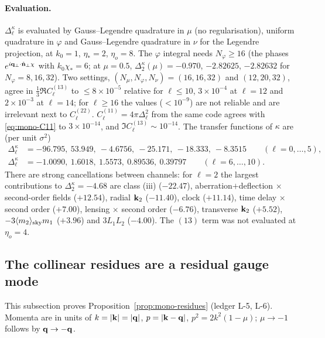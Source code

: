 \paragraph{Evaluation.}  $\Delta^\kappa_\ell$ is evaluated by Gauss--Legendre quadrature in $\mu$ (no regularisation), uniform quadrature in
$\varphi$ and Gauss--Legendre quadrature in $\nu$ for the Legendre projection, at $k_0=1$, $\eta_*=2$, $\eta_o=8$.  The $\varphi$ integral needs
$N_\varphi\ge16$ (the phases $e^{i\mathbf q_\perp\cdot\hat{\mathbf n}_\perp\chi}$ with $k_0\chi_*=6$; at $\mu=0.5$, $\Delta^\kappa_2(\mu)=-0.970$, $-2.82625$, $-2.82632$ for
$N_\varphi=8,16,32$).  Two settings, $(N_\mu,N_\varphi,N_\nu)=(16,16,32)$ and $(12,20,32)$, agree in $\tfrac13\Re C^{(13)}_\ell$ to $\le8\times10^{-5}$ relative
for $\ell\le10$, $3\times10^{-4}$ at $\ell=12$ and $2\times10^{-3}$ at $\ell=14$; for $\ell\ge16$ the values ($<10^{-9}$) are not reliable and are
irrelevant next to $C^{(22)}_\ell$.  $C^{(11)}_\ell=4\pi\Delta_\ell^2$ from the same code agrees with \eqref{eq:mono-C11} to $3\times10^{-14}$, and
$\Im C^{(13)}_\ell\sim10^{-14}$.  The transfer functions of $\kappa$ are (per unit $\sigma^2$)
\begin{align}
\Delta^\kappa_\ell&=-96.795,\ 53.949,\ -4.6756,\ -25.171,\ -18.333,\ -8.3515\qquad(\ell=0,\dots,5),\nonumber\\
\Delta^\kappa_\ell&=-1.0090,\ 1.6018,\ 1.5573,\ 0.89536,\ 0.39797\qquad(\ell=6,\dots,10).
\label{eq:mono-Dkappa}
\end{align}
There are strong cancellations between channels: for $\ell=2$ the largest contributions to $\Delta^\kappa_2=-4.68$ are class (iii) ($-22.47$),
aberration$+$deflection $\times$ second-order fields ($+12.54$), radial $\mathbf k_2$ ($-11.40$), clock ($+11.14$), time delay $\times$ second order ($+7.00$),
lensing $\times$ second order ($-6.76$), transverse $\mathbf k_2$ ($+5.52$), $-3\langle m_2\rangle_{\rm sky}m_1$ ($+3.96$) and $3L_1L_2$ ($-4.00$).  The $(13)$ term was
not evaluated at $\eta_o=4$.

\subsection{The collinear residues are a residual gauge mode}
\label{sec:mono-gauge}
This subsection proves Proposition~\ref{prop:mono-residues} (ledger L-5, L-6).  Momenta are in units of $k=|\mathbf k|=|\mathbf q|$, $p=|\mathbf k-\mathbf q|$,
$p^2=2k^2(1-\mu)$; $\mu\to-1$ follows by $\mathbf q\to-\mathbf q$.


